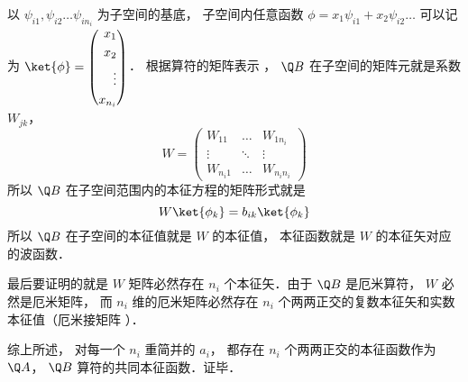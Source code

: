 以 $\psi_{i1}, \psi_{i2} \dots \psi_{i n_i}$ 为子空间的基底， 子空间内任意函数 $\phi  = x_1 \psi_{i1} + x_2 \psi_{i2}\dots$ 可以记为 $\ket{\phi}  = \left( \begin{aligned}
{x_1}\\
{x_2}\\
\vdots \\
{x_{{n_i}}}
\end{aligned} \right)$． 根据算符的矩阵表示%
， $\Q B$ 在子空间的矩阵元就是系数 $W_{jk}$， 
\begin{equation}
W = \left( {\begin{aligned}
{{W_{11}}}& \ldots &{{W_{1{n_i}}}}\\
 \vdots & \ddots & \vdots \\
{{W_{{n_i}1}}}& \ldots &{{W_{{n_i}{n_i}}}}
\end{aligned}} \right)
\end{equation}
所以 $\Q B$ 在子空间范围内的本征方程的矩阵形式就是
\begin{equation}
W \ket{\phi_k} = b_{ik} \ket{\phi_k}
\end{equation}
所以 $\Q B$ 在子空间的本征值就是 $W$ 的本征值， 本征函数就是 $W$ 的本征矢对应的波函数．

最后要证明的就是 $W$ 矩阵必然存在 $n_i$ 个本征矢．由于 $\Q B$ 是厄米算符，  $W$ 必然是厄米矩阵， 而 $n_i$ 维的厄米矩阵必然存在 $n_i$ 个两两正交的复数本征矢和实数本征值（厄米接矩阵%
）．

综上所述， 对每一个 $n_i$ 重简并的 $a_i$，  都存在 $n_i$ 个两两正交的本征函数作为 $\Q A$，  $\Q B$ 算符的共同本征函数．证毕．
